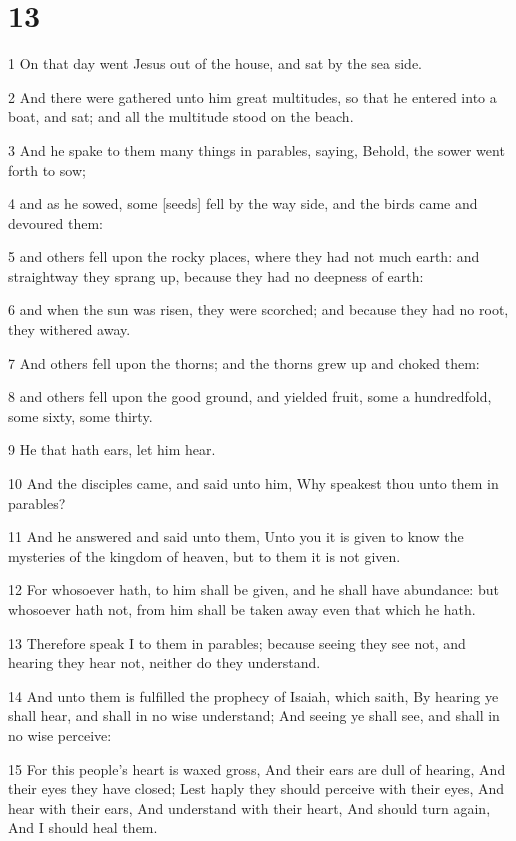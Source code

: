 \chapter{13}

\par 1 On that day went Jesus out of the house, and sat by the sea side.
\par 2 And there were gathered unto him great multitudes, so that he entered into a boat, and sat; and all the multitude stood on the beach.
\par 3 And he spake to them many things in parables, saying, Behold, the sower went forth to sow;
\par 4 and as he sowed, some [seeds] fell by the way side, and the birds came and devoured them:
\par 5 and others fell upon the rocky places, where they had not much earth: and straightway they sprang up, because they had no deepness of earth:
\par 6 and when the sun was risen, they were scorched; and because they had no root, they withered away.
\par 7 And others fell upon the thorns; and the thorns grew up and choked them:
\par 8 and others fell upon the good ground, and yielded fruit, some a hundredfold, some sixty, some thirty.
\par 9 He that hath ears, let him hear.
\par 10 And the disciples came, and said unto him, Why speakest thou unto them in parables?
\par 11 And he answered and said unto them, Unto you it is given to know the mysteries of the kingdom of heaven, but to them it is not given.
\par 12 For whosoever hath, to him shall be given, and he shall have abundance: but whosoever hath not, from him shall be taken away even that which he hath.
\par 13 Therefore speak I to them in parables; because seeing they see not, and hearing they hear not, neither do they understand.
\par 14 And unto them is fulfilled the prophecy of Isaiah, which saith, By hearing ye shall hear, and shall in no wise understand; And seeing ye shall see, and shall in no wise perceive:
\par 15 For this people's heart is waxed gross, And their ears are dull of hearing, And their eyes they have closed; Lest haply they should perceive with their eyes, And hear with their ears, And understand with their heart, And should turn again, And I should heal them.
